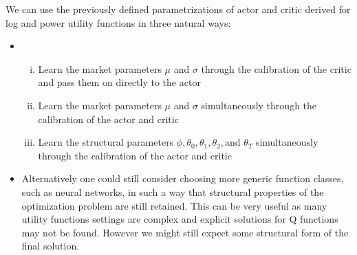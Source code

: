 We can use the previously defined parametrizations of actor and critic derived for log and power utility functions in three natural ways:

\begin{itemize}
\item
\begin{enumerate}[(i)]
    


    \item Learn the market parameters $\mu$ and $\sigma$ through the calibration of the critic and pass them on directly to the actor
    \item Learn the market parameters $\mu$ and $\sigma$ simultaneously through the calibration of the actor and critic
    \item Learn the structural parameters $\phi,\theta_0, \theta_1, \theta_2, \text{and } \theta_T$ simultaneously through the calibration of the actor and critic 

\end{enumerate}
\item Alternatively one could still consider choosing more generic function classes, such as neural networks, in such a way that structural properties of the optimization problem are still retained. This can be very useful as many utility functions settings are complex and explicit solutions for Q functions may not be found. However we might still expect some structural form of the final solution.

    
\end{itemize}





